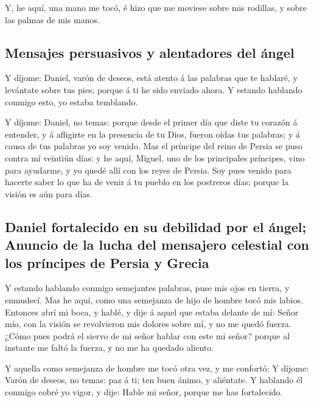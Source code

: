  Y, he aquí, una mano me tocó, é hizo que me moviese
sobre mis rodillas, y sobre las palmas de mis manos.

\hypertarget{mensajes-persuasivos-y-alentadores-del-uxe1ngel}{%
\subsection{Mensajes persuasivos y alentadores del
ángel}\label{mensajes-persuasivos-y-alentadores-del-uxe1ngel}}

 Y díjome: Daniel, varón de deseos, está atento á las
palabras que te hablaré, y levántate sobre tus pies; porque á ti he sido
enviado ahora. Y estando hablando conmigo esto, yo estaba temblando.

 Y díjome: Daniel, no temas: porque desde el primer día
que diste tu corazón á entender, y á afligirte en la presencia de tu
Dios, fueron oídas tus palabras; y á causa de tus palabras yo soy
venido.  Mas el príncipe del reino de Persia se puso
contra mí veintiún días: y he aquí, Miguel, uno de los principales
príncipes, vino para ayudarme, y yo quedé allí con los reyes de Persia.
 Soy pues venido para hacerte saber lo que ha de venir á
tu pueblo en los postreros días; porque la visión es aún para días.

\hypertarget{daniel-fortalecido-en-su-debilidad-por-el-uxe1ngel-anuncio-de-la-lucha-del-mensajero-celestial-con-los-pruxedncipes-de-persia-y-grecia}{%
\subsection{Daniel fortalecido en su debilidad por el ángel; Anuncio de
la lucha del mensajero celestial con los príncipes de Persia y
Grecia}\label{daniel-fortalecido-en-su-debilidad-por-el-uxe1ngel-anuncio-de-la-lucha-del-mensajero-celestial-con-los-pruxedncipes-de-persia-y-grecia}}

 Y estando hablando conmigo semejantes palabras, puse mis
ojos en tierra, y enmudecí.  Mas he aquí, como una
semejanza de hijo de hombre tocó mis labios. Entonces abrí mi boca, y
hablé, y dije á aquel que estaba delante de mí: Señor mío, con la visión
se revolvieron mis dolores sobre mí, y no me quedó fuerza.
 ¿Cómo pues podrá el siervo de mi señor hablar con este
mi señor? porque al instante me faltó la fuerza, y no me ha quedado
aliento.

 Y aquella como semejanza de hombre me tocó otra vez, y
me confortó;  Y díjome: Varón de deseos, no temas: paz á
ti; ten buen ánimo, y aliéntate. Y hablando él conmigo cobré yo vigor, y
dije: Hable mi señor, porque me has fortalecido.

